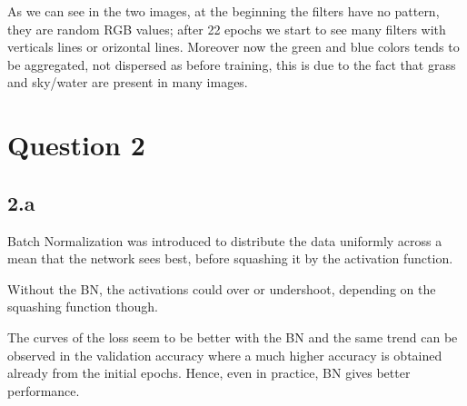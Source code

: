 \documentclass{article}
\begin{document}
As we can see in the two images, at the beginning the filters have no pattern, they are random RGB values; after 22 epochs we start to see many filters with verticals lines or orizontal lines. Moreover now the green and blue colors tends to be aggregated, not dispersed as before training, this is due to the fact that grass and sky/water are present in many images.
\begin{figure}[!h]
	\begin{center}
		\hspace{1mm}
	\end{center}
	\captionsetup{justification=raggedright,margin=1cm}
	\label{gr}
\end{figure}

\newpage

\section{Question 2}

\subsection*{2.a}

Batch Normalization was introduced to distribute the data uniformly across a mean that the network sees best, before squashing it by the activation function.

Without the BN, the activations could over or undershoot, depending on the squashing function though.


\begin{figure}[!h]
	\begin{center}
		\hspace{1mm}
	\end{center}
	\captionsetup{justification=raggedright,margin=1cm}
	\label{gr}
\end{figure}
The curves of the loss seem to be better with the BN and the same trend can be observed in the validation accuracy where a much higher accuracy is obtained already from the initial epochs.
Hence, even in practice, BN gives better performance.
\begin{figure}[!h]
	\begin{center}
		\hspace{1mm}
	\end{center}
	\captionsetup{justification=raggedright,margin=1cm}
	\label{gr}
\end{figure}
\end{document}
